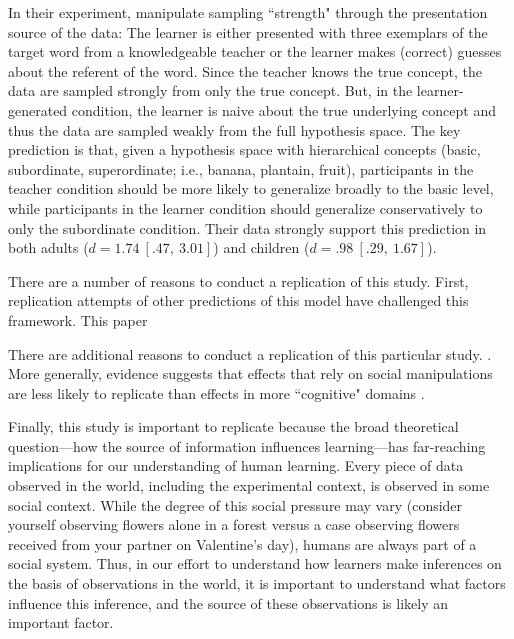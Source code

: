 \documentclass[man]{apa2}
\begin{document}
In their experiment,  manipulate  sampling  ``strength"  through  the presentation source of the data: The learner is either presented with three exemplars of the target word from a knowledgeable teacher or the learner makes (correct) guesses about the referent of the word. Since the teacher  knows the true concept, the data are sampled strongly from only the true concept. But, in the learner-generated condition, the learner is naive about the true underlying concept and thus the data are sampled weakly from the full hypothesis space.  The key prediction is that, given a hypothesis space with hierarchical concepts (basic, subordinate, superordinate; i.e.,  banana, plantain, fruit),  participants in the teacher condition should be more likely to generalize broadly to the basic level, while participants in the learner condition should generalize conservatively to only the subordinate condition. Their data strongly support this prediction in both adults ($d = 1.74\ [.47,\ 3.01]$) and children  ($d = .98\ [.29,\ 1.67]$).


There are a number of reasons to conduct a replication of this study. First, replication attempts of other predictions of this model have challenged this framework. This paper 
\cite{xu2007a}
\cite{spencer2011}
\cite{jenkins2015non}


There are additional reasons to conduct a replication of this particular study. \cite{navarro2012sampling}. More generally, evidence suggests that effects that rely on social manipulations are less likely to replicate than effects in more ``cognitive" domains \cite{reproProj2015}.

Finally, this study is important to replicate because the broad theoretical question---how the source of information influences learning---has far-reaching implications for our understanding of human learning. Every piece of data observed in the world, including the experimental context,  is observed in some social context. While the degree of this social pressure may vary (consider yourself observing flowers  alone in a forest versus a case observing flowers received from your partner on Valentine's day), humans are always part of a social system. Thus, in our effort to understand how learners make inferences on the basis of observations in the world, it is important to understand what factors influence this inference, and the source of these observations is likely an important factor.
\end{document}
